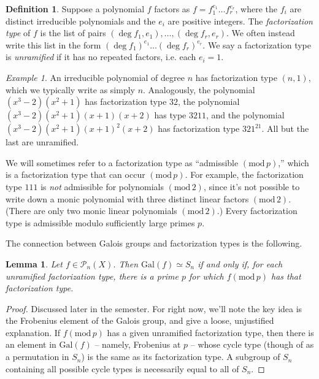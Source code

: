 \documentclass[12pt]{amsart}
\newtheorem{lemma}[theorem]{Lemma}
\theoremstyle{definition} \newtheorem*{notation}{Notation}
\theoremstyle{remark} \newtheorem*{remark}{Remark}
\theoremstyle{remark} \newtheorem*{example}{Example}
\theoremstyle{definition} \newtheorem*{definition}{Definition}
\numberwithin{equation}{section}
\numberwithin{theorem}{section}
\renewcommand{\pmod}[1]{\left(\mathrm{mod}\,#1\right)}
\begin{document}
	\begin{definition}
		Suppose a polynomial $f$ factors as $f = f_1^{e_1} \dots f_r^{e_r}$, where the $f_i$ are distinct irreducible polynomials and the $e_i$ are positive integers.  The \emph{factorization type} of $f$ is the list of pairs $(\deg f_1, e_1),\dots, (\deg f_r, e_r)$.  We often instead write this list in the form $(\deg f_1)^{e_1} \dots (\deg f_r)^{e_r}$.  We say a factorization type is \emph{unramified} if it has no repeated factors, i.e. each $e_i = 1$.
	\end{definition}
	
	\begin{example}
		An irreducible polynomial of degree $n$ has factorization type $(n,1)$, which we typically write as simply $n$.  Analogously, the polynomial $(x^3-2)(x^2+1)$ has factorization type $32$, the polynomial $(x^3-2)(x^2+1)(x+1)(x+2)$ has type $3211$, and the polynomial $(x^3-2)(x^2+1)(x+1)^2(x+2)$ has factorization type $321^21$.  All but the last are unramified.
	\end{example}
	
	We will sometimes refer to a factorization type as ``admissible $\pmod{p}$,'' which is a factorization type that can occur $\pmod{p}$.  For example, the factorization type $111$ is \emph{not} admissible for polynomials $\pmod{2}$, since it's not possible to write down a monic polynomial with three distinct linear factors $\pmod{2}$.  (There are only two monic linear polynomials $\pmod{2}$.)  Every factorization type is admissible modulo sufficiently large primes $p$.
	
	The connection between Galois groups and factorization types is the following.
	
	\begin{lemma}\label{lem:frob-factor}
		Let $f \in \mathcal{P}_n(X)$.  Then $\mathrm{Gal}(f) \simeq S_n$ if and only if, for each unramified factorization type, there is a prime $p$ for which $f \pmod{p}$ has that factorization type.
	\end{lemma}
	\begin{proof}
		Discussed later in the semester.  For right now, we'll note the key idea is the Frobenius element of the Galois group, and give a loose, unjustified explanation.  If $f \pmod{p}$ has a given unramified factorization type, then there is an element in $\mathrm{Gal}(f)$ -- namely, Frobenius at $p$ -- whose cycle type (though of as a permutation in $S_n$) is the same as its factorization type.  A subgroup of $S_n$ containing all possible cycle types is necessarily equal to all of $S_n$.
	\end{proof}
	
\end{document}
